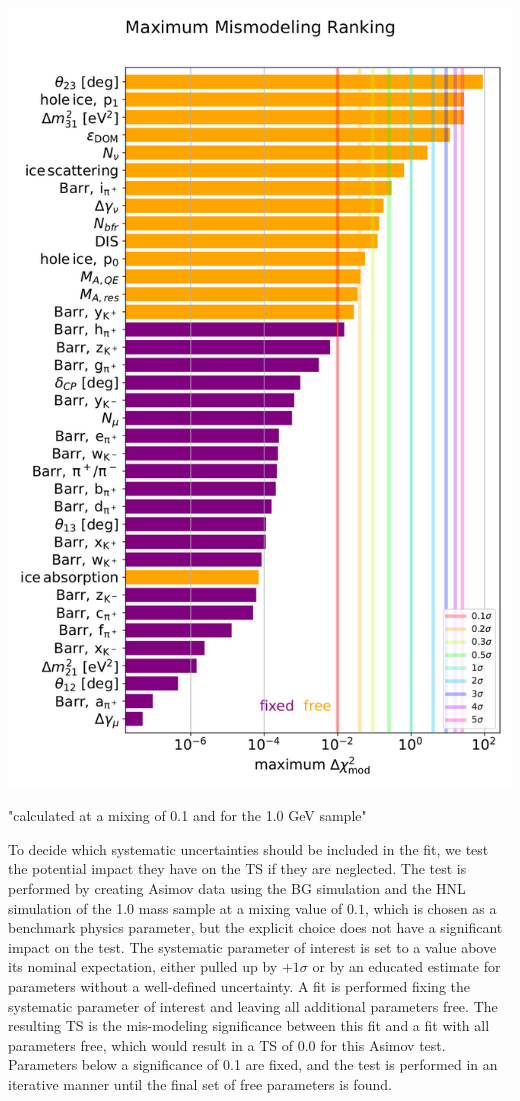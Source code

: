 \begin{marginfigure}
    \includegraphics{figures/results/checks/plot_systematic_impact_ranking.png}
	\caption[xx]{"calculated at a mixing of 0.1 and for the 1.0 GeV sample"}
\end{marginfigure}

To decide which systematic uncertainties should be included in the fit, we test the potential impact they have on the TS if they are neglected. The test is performed by creating Asimov data using the BG simulation and the HNL simulation of the \SI{1.0}{\gev} mass sample at a mixing value of $0.1$, which is chosen as a benchmark physics parameter, but the explicit choice does not have a significant impact on the test. The systematic parameter of interest is set to a value above its nominal expectation, either pulled up by $+1\sigma$ or by an educated estimate for parameters without a well-defined uncertainty. A fit is performed fixing the systematic parameter of interest and leaving all additional parameters free. The resulting TS is the mis-modeling significance between this fit and a fit with all parameters free, which would result in a TS of 0.0 for this Asimov test. Parameters below a significance of \SI{0.1}{\sigma} are fixed, and the test is performed in an iterative manner until the final set of free parameters is found.

